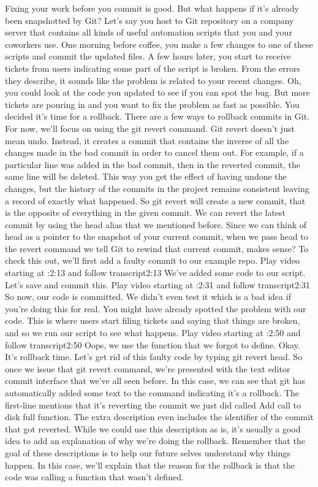 	
	Fixing your work before you commit is good. But what happens if it's already been snapshotted by Git? Let's say you host to Git repository on a company server that contains all kinds of useful automation scripts that you and your coworkers use. One morning before coffee, you make a few changes to one of these scripts and commit the updated files. A few hours later, you start to receive tickets from users indicating some part of the script is broken. From the errors they describe, it sounds like the problem is related to your recent changes. Oh, you could look at the code you updated to see if you can spot the bug. But more tickets are pouring in and you want to fix the problem as fast as possible. You decided it's time for a rollback. There are a few ways to rollback commits in Git. For now, we'll focus on using the git revert command. Git revert doesn't just mean undo. Instead, it creates a commit that contains the inverse of all the changes made in the bad commit in order to cancel them out. For example, if a particular line was added in the bad commit, then in the reverted commit, the same line will be deleted. This way you get the effect of having undone the changes, but the history of the commits in the project remains consistent leaving a record of exactly what happened. So git revert will create a new commit, that is the opposite of everything in the given commit. We can revert the latest commit by using the head alias that we mentioned before. Since we can think of head as a pointer to the snapshot of your current commit, when we pass head to the revert command we tell Git to rewind that current commit, makes sense? To check this out, we'll first add a faulty commit to our example repo.
	Play video starting at :2:13 and follow transcript2:13
	We've added some code to our script. Let's save and commit this.
	Play video starting at :2:31 and follow transcript2:31
	So now, our code is committed. We didn't even test it which is a bad idea if you're doing this for real. You might have already spotted the problem with our code. This is where users start filing tickets and saying that things are broken, and so we run our script to see what happens.
	Play video starting at :2:50 and follow transcript2:50
	Oops, we use the function that we forgot to define. Okay. It's rollback time. Let's get rid of this faulty code by typing git revert head. So once we issue that git revert command, we're presented with the text editor commit interface that we've all seen before. In this case, we can see that git has automatically added some text to the command indicating it's a rollback. The first-line mentions that it's reverting the commit we just did called Add call to disk full function. The extra description even includes the identifier of the commit that got reverted. While we could use this description as is, it's usually a good idea to add an explanation of why we're doing the rollback. Remember that the goal of these descriptions is to help our future selves understand why things happen. In this case, we'll explain that the reason for the rollback is that the code was calling a function that wasn't defined.
